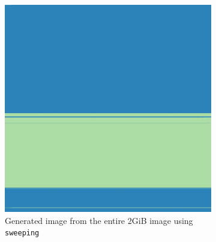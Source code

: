 \documentclass[
  digital, %
  color,   %
  oneside, %
  lof,     %
  nolot,     %
]{fithesis4}
\begin{document}
\begin{figure}
  \centering
  \begin{subfigure}[t]{.45\textwidth}
    \centering
    \includegraphics[width=\textwidth,interpolate=false]{ext4-luks2-sweeping.png}
    \caption{Generated image from the entire 2GiB image using \texttt{sweeping}}
    \label{fig:luks-enc}
  \end{subfigure}
  \hfill
  \begin{subfigure}[t]{.45\textwidth}
    \centering

\end{subfigure}
\end{figure}
\end{document}
